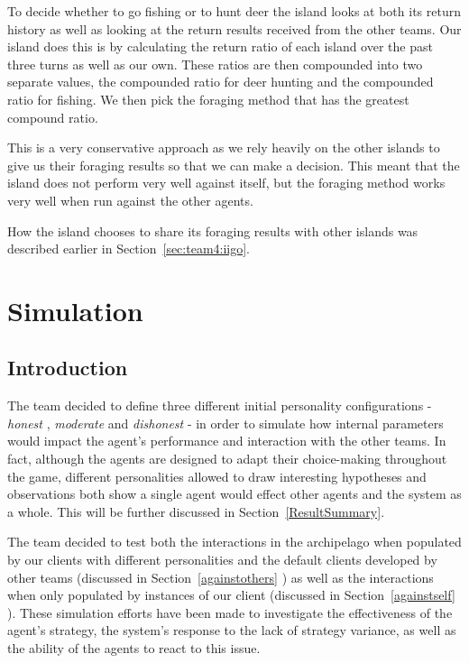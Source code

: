 To decide whether to go fishing or to hunt deer the island looks at both its return history as well as looking at the return results received from the other teams. Our island does this is by calculating the return ratio of each island over the past three turns as well as our own. These ratios are then compounded into two separate values, the compounded ratio for deer hunting and the compounded ratio for fishing.  We then pick the foraging method that has the greatest compound ratio. 

This is a very conservative approach as we rely heavily on the other islands to give us their foraging results so that we can make a decision. This meant that the island does not perform very well against itself, but the foraging method works very well when run against the other agents.

How the island chooses to share its foraging results with other islands was described earlier in Section~\ref{sec:team4:iigo}. 


\section{Simulation}



\subsection{Introduction}
The team decided to define three different initial personality configurations -
\emph{honest} , \emph{moderate} and \emph{dishonest} - in order to simulate how internal parameters would impact the agent's performance and interaction with the other teams.
In fact, although the agents are designed to adapt their choice-making throughout the game, different personalities allowed to draw interesting hypotheses and observations both show a single agent would effect other agents and the system as a whole. This will be further discussed in Section~\ref{ResultSummary}. 

The team decided to test both the interactions in the archipelago when populated by our clients with different personalities and the default clients developed by other teams (discussed in Section~\ref{againstothers} ) as well as the interactions when only populated by instances of our client (discussed in Section~\ref{againstself} ). These simulation efforts have been made to investigate the effectiveness of the agent's strategy, the system's response to the lack of strategy variance, as well as the ability of the agents to react to this issue.

